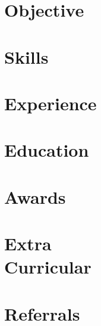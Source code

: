 \documentclass[a4paper]{resume}
\begin{document}
\def \sepspace {\vspace{1em}}
\makeheader{\contactphone}{\contactemail}{\contactwebsite}
\section{Objective}{\small \objective}
\section{Skills}{\skillstechnical}
\section{Experience}{\experience}
\section{Education}{\education}
\section{Awards}{\awards}
\section{Extra\\Curricular}{\extracurricular}
\section{Referrals}{}
\end{document}
